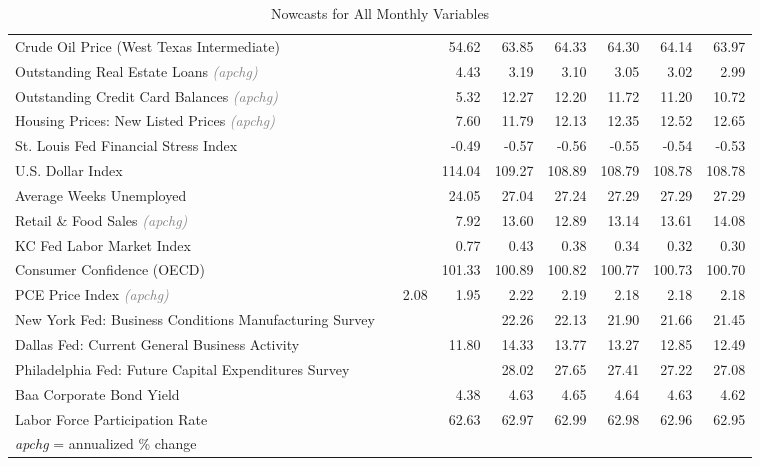 \documentclass[11pt, letterpaper]{article}\usepackage[]{graphicx}\usepackage[]{color}
\begin{document}
\begin{table}[H]
\begin{tabular}{lrrrrrrrr}
  Crude Oil Price (West Texas Intermediate) &  &  & 54.62 & 63.85 & 64.33 & 64.30 & 64.14 & 63.97 \\ 
  Outstanding Real Estate Loans \textit{\footnotesize\textcolor{gray}{(apchg)}} &  &  & 4.43 & 3.19 & 3.10 & 3.05 & 3.02 & 2.99 \\ 
  Outstanding Credit Card Balances \textit{\footnotesize\textcolor{gray}{(apchg)}} &  &  & 5.32 & 12.27 & 12.20 & 11.72 & 11.20 & 10.72 \\ 
  Housing Prices: New Listed Prices \textit{\footnotesize\textcolor{gray}{(apchg)}} &  &  & 7.60 & 11.79 & 12.13 & 12.35 & 12.52 & 12.65 \\ 
  St. Louis Fed Financial Stress Index &  &  & -0.49 & -0.57 & -0.56 & -0.55 & -0.54 & -0.53 \\ 
  U.S. Dollar Index &  &  & 114.04 & 109.27 & 108.89 & 108.79 & 108.78 & 108.78 \\ 
  Average Weeks Unemployed &  &  & 24.05 & 27.04 & 27.24 & 27.29 & 27.29 & 27.29 \\ 
  Retail \& Food Sales \textit{\footnotesize\textcolor{gray}{(apchg)}} &  &  & 7.92 & 13.60 & 12.89 & 13.14 & 13.61 & 14.08 \\ 
  KC Fed Labor Market Index &  &  & 0.77 & 0.43 & 0.38 & 0.34 & 0.32 & 0.30 \\ 
  Consumer Confidence (OECD) &  &  & 101.33 & 100.89 & 100.82 & 100.77 & 100.73 & 100.70 \\ 
  PCE Price Index \textit{\footnotesize\textcolor{gray}{(apchg)}} &  & 2.08 & 1.95 & 2.22 & 2.19 & 2.18 & 2.18 & 2.18 \\ 
  New York Fed: Business Conditions Manufacturing Survey &  &  &  & 22.26 & 22.13 & 21.90 & 21.66 & 21.45 \\ 
  Dallas Fed: Current General Business Activity &  &  & 11.80 & 14.33 & 13.77 & 13.27 & 12.85 & 12.49 \\ 
  Philadelphia Fed: Future Capital Expenditures Survey &  &  &  & 28.02 & 27.65 & 27.41 & 27.22 & 27.08 \\ 
  Baa Corporate Bond Yield &  &  & 4.38 & 4.63 & 4.65 & 4.64 & 4.63 & 4.62 \\ 
  Labor Force Participation Rate &  &  & 62.63 & 62.97 & 62.99 & 62.98 & 62.96 & 62.95 \\ 
   \hline 
 \textit{apchg} = annualized \% change 
\end{tabular}
\endgroup
\caption{Nowcasts for All Monthly Variables} 
\end{table}
\end{document}
